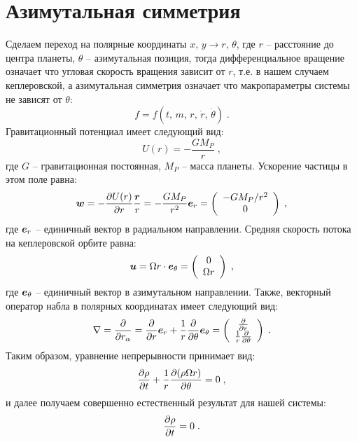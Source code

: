 \section{Азимутальная симметрия}
Сделаем переход на полярные координаты $x,\,y\to r,\,\theta$, где $r$ -- расстояние до центра планеты, $\theta$ -- 
азимутальная позиция, тогда дифференциальное вращение означает что угловая скорость вращения зависит от $r$, т.е.
в нашем случаем кеплеровской, а азимутальная симметрия означает что макропараметры системы не зависят от $\theta$:
\begin{equation}
    f=f(t,\,m,\,r,\,\dot{r},\,\dot\theta)\;.
\end{equation}
Гравитационный потенциал имеет следующий вид:
\begin{equation}
    U(r) = -\frac{GM_P}{r}\;,
\end{equation}
где $G$ -- гравитационная постоянная,  $M_P$ -- масса планеты. Ускорение частицы в этом поле равна:
\begin{equation}
     \bm{w} = -\frac{\partial U(r)}{\partial r}\frac{\bm{r}}{r}=-\frac{GM_P}{r^2}\bm{e}_r = 
     \left(\begin{array}{c}
         -GM_P/r^2 \\ 0
     \end{array}\right)\;,
\end{equation}
где $\bm{e}_r$ -- единичный вектор в радиальном направлении. Средняя скорость потока на кеплеровской орбите равна:
\begin{equation}
    \bm{u} = \Omega r\cdot\bm{e}_{\theta}=\left(\begin{array}{c}
        0 \\ \Omega r
    \end{array}\right)\;,
\end{equation}
где $\bm{e}_{\theta}$ -- единичный вектор в азимутальном направлении. Также, векторный оператор набла в полярных координатах
имеет следующий вид:
\begin{equation}
    \nabla = \frac{\partial}{\partial r_{\alpha}} = \frac{\partial}{\partial r}\bm{e}_r+\frac{1}{r}\frac{\partial}{\partial\theta}\bm{e}_{\theta}=
    \left(\begin{array}{c}
        \frac{\partial}{\partial r} \\ \frac{1}{r}\frac{\partial}{\partial\theta}
    \end{array}\right)\;.
\end{equation}
Таким образом, уравнение непрерывности принимает вид:
\begin{equation}
    \frac{\partial\rho}{\partial t}+\frac{1}{r}\frac{\partial(\rho\Omega r)}{\partial\theta} = 0\;,
\end{equation}
и далее получаем совершенно естественный результат для нашей системы:
\begin{equation}
    \frac{\partial\rho}{\partial t} = 0\;.
\end{equation}

